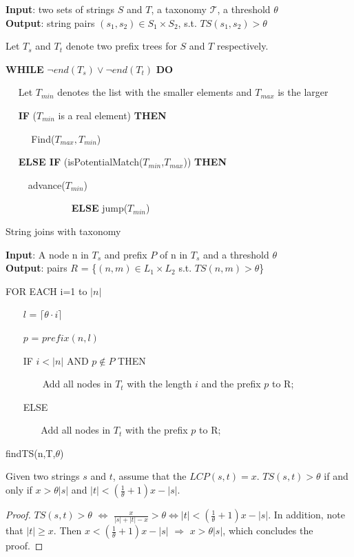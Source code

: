 \begin{algorithm}
{\bf Input}: two sets of strings $S$ and $T$, a taxonomy $\mathcal{T}$, a threshold $\theta$ \\
{\bf Output}: string pairs $(s_1,s_2) \in S_1 \times S_2$, s.t. $TS(s_1, s_2) > \theta$
\begin{compactenum}[(1)]
\item Let $T_s$ and $T_t$ denote two prefix trees for $S$ and $T$ respectively.
\item {\bf WHILE} $\neg end(T_s) \vee \neg end(T_t)$ {\bf DO}
\item ~~ Let $T_{min}$ denotes the list with the smaller elements and $T_{max}$ is the larger 
\item  ~~ {\bf IF} ($T_{min}$ is a real element) {\bf THEN}
\item  ~~  ~~  Find($T_{max},T_{min}$)
\item ~~ {\bf ELSE IF} (isPotentialMatch($T_{min}$,$T_{max}$))  {\bf THEN}
 \item ~~~~ advance($T_{min}$)
 \item ~~~~~~~~~~~~~ {\bf ELSE} jump($T_{min}$)

\end{compactenum}
\caption{String joins with taxonomy}
\label{alg:exactjoin}
\end{algorithm}


\begin{algorithm}
{\bf Input}: A node n in $T_s$ and prefix $P$ of n in $T_s$ and a threshold $\theta$ \\
{\bf Output}:  pairs $R$ = \{$(n,m) \in L_1 \times L_2$ s.t. $TS(n,m) > \theta$\}
\begin{compactenum}[(1)]
\item FOR EACH i=1 to $|n|$
\item ~~~ $l$ = $\lceil \theta \cdot i \rceil$
\item ~~~ $p$ = $prefix(n,l)$
\item ~~~ IF $i < |n|$ AND $p \notin P$ THEN
\item ~~~~~~~ Add all nodes in $T_t$ with the length $i$ and the prefix $p$ to R;
\item ~~~ ELSE
\item ~~~  ~~~  Add all nodes in $T_t$ with the prefix $p$ to R;
\end{compactenum}
\caption{findTS(n,T,$\theta$)}
\label{alg:treejoin}
\end{algorithm}

\begin{lem} Given two strings $s$ and $t$,  assume that the $LCP(s,t) = x$. $TS(s,t) > \theta$ if and only if  $ x > \theta |s| $ and $  |t| < (\frac{1}{\theta}+1)x-|s|$.
\end{lem}
\begin{proof}  $TS(s,t) > \theta$ $\Leftrightarrow$ $\frac{x}{|s|+|t|-x} > \theta \Leftrightarrow |t| < (\frac{1}{\theta}+1)x-|s|$. In addition, note that $|t| \geq x$. Then $x < (\frac{1}{\theta}+1)x-|s|$ $\Rightarrow$ $x > \theta |s| $, which concludes the proof.
\end{proof}


